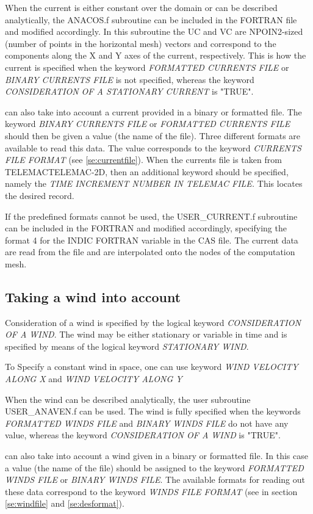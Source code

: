  When the current is either constant over the domain or can be described analytically, the ANACOS.f subroutine can be included in the FORTRAN file and modified accordingly. In this subroutine the UC and VC are NPOIN2-sized (number of points in the horizontal mesh) vectors and correspond to the components along the X and Y axes of the current, respectively. This is how the current is specified when the keyword \textit{FORMATTED CURRENTS FILE} or \textit{BINARY CURRENTS FILE }is not specified, whereas the keyword \textit{CONSIDERATION OF A STATIONARY CURRENT} is "TRUE".

 \tomawac can also take into account a current provided in a binary or formatted file. The keyword \textit{BINARY CURRENTS FILE }or\textit{ FORMATTED CURRENTS FILE} should then be given a value (the name of the file). Three different formats are available to read this data. The value corresponds to the keyword \textit{CURRENTS FILE FORMAT} (see \ref{se:currentfile}). When the currents file is taken from TELEMACTELEMAC-2D, then an additional keyword should be specified, namely the \textit{TIME INCREMENT NUMBER IN TELEMAC FILE.} This locates the desired record.

 If the predefined formats cannot be used, the USER\_CURRENT.f subroutine can be included in the FORTRAN and modified accordingly, specifying the format 4 for the INDIC FORTRAN variable in the CAS file. The current data are read from the file and are interpolated onto the nodes of the computation mesh.


\subsection{ Taking a wind into account}
\label{se:wind}
Consideration of a wind is specified by the logical keyword \textit{CONSIDERATION OF A WIND}. The wind may be either stationary or variable in time and is specified by means of the logical keyword \textit{STATIONARY WIND}.

To Specify a constant wind in space, one can use keyword \textit{WIND VELOCITY ALONG X} and \textit{WIND VELOCITY ALONG Y}

 When the wind can be described analytically, the user subroutine USER\_ANAVEN.f can be used. The wind is fully specified when the keywords \textit{FORMATTED WINDS FILE} and \textit{BINARY WINDS FILE} do not have any value, whereas the keyword \textit{CONSIDERATION OF A WIND }is "TRUE".

 \tomawac can also take into account a wind given in a binary or formatted file. In this case a value (the name of the file) should be assigned to the keyword \textit{FORMATTED WINDS FILE }or \textit{BINARY WINDS FILE}. The available formats for reading out these data correspond to the keyword \textit{WINDS FILE FORMAT} (see in section \ref{se:windfile} and \ref{se:desformat}).

